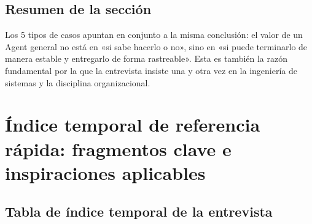 \documentclass[a4paper]{article}
\begin{document}
\subsection{Resumen de la sección}

Los 5 tipos de casos apuntan en conjunto a la misma conclusión: el valor de un Agent general no está en «si sabe hacerlo o no», sino en «si puede terminarlo de manera estable y entregarlo de forma rastreable». Esta es también la razón fundamental por la que la entrevista insiste una y otra vez en la ingeniería de sistemas y la disciplina organizacional.

\section{Índice temporal de referencia rápida: fragmentos clave e inspiraciones aplicables}

\subsection{Tabla de índice temporal de la entrevista}
\end{document}
